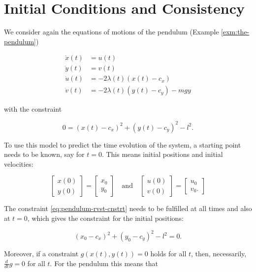 \documentclass[]{book}
\theoremstyle{definition}
\theoremstyle{definition}
\theoremstyle{definition}
\theoremstyle{remark}
\begin{document}
\hypertarget{initial-conditions-and-consistency}{%
\section{Initial Conditions and Consistency}\label{initial-conditions-and-consistency}}

We consider again the equations of motions of the pendulum (Example \ref{exm:the-pendulum})

\begin{align*}
    \dot x(t) &= u(t) \\
    \dot y(t) &= v(t) \\
    \dot u(t) &= - 2 \lambda(t) (x(t) - c_x) \\ 
    \dot v(t) &= - 2 \lambda(t) (y(t) - c_y) - mgy
\end{align*}

with the constraint

\begin{equation}
    0=(x(t) - c_x)^2 + (y(t) - c_y)^2 - l^2. \label{eq:pendulum-rvst-cnstrt}
\end{equation}

To use this model to predict the time evolution of the system, a starting point needs to be known, say for \(t=0\). This means initial positions and initial velocities:

\[
\begin{bmatrix} 
x(0) \\ y(0)
\end{bmatrix}
=
\begin{bmatrix} 
    x_0 \\ y_0
\end{bmatrix}
\quad\text{and}\quad
\begin{bmatrix} 
u(0) \\ v(0)
\end{bmatrix}
=
\begin{bmatrix} 
    u_0 \\ v_0.
\end{bmatrix}
\]

The constraint \eqref{eq:pendulum-rvst-cnstrt} needs to be fulfilled at all times and also at \(t=0\), which gives the constraint for the initial positions:

\begin{equation*}
    (x_0 - c_x)^2 + (y_0 - c_y)^2 - l^2=0.
\end{equation*}

Moreover, if a constraint \(g(x(t), y(t))=0\) holds for all \(t\), then, necessarily, \(\frac{d}{dt}g=0\) for all \(t\). For the pendulum this means that
\end{document}
